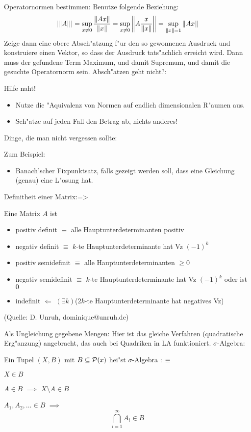 \trick Operatornormen bestimmen:{
  Benutze folgende Beziehung:
  \[\fnorm A = \sup_{x\ne 0} \frac{\norm{Ax}}{\norm{x}}
             = \sup_{x\ne 0} \norm{ A \frac x {\norm{x}} }
	     = \sup_{\norm{x} = 1} \norm{Ax}
    \]
  Zeige dann eine obere Absch"atzung f"ur den so gewonnenen Ausdruck und 
  konstruiere einen Vektor, so dass der Ausdruck tats"achlich erreicht wird.
  Dann muss der gefundene Term Maximum, und damit Supremum, und damit
  die gesuchte Operatornorm sein.
  }
\trick Absch"atzen geht nicht?:{
  Hilfe naht! 
  \begin{itemize}
    \item Nutze die "Aquivalenz von Normen auf endlich dimensionalen R"aumen 
      aus.
    \item Sch"atze auf jeden Fall den Betrag ab, nichts anderes!
    \end{itemize}
  }
\trick Dinge, die man nicht vergessen sollte:{
  Zum Beispiel:
  \begin{itemize}
    \item Banach'scher Fixpunktsatz, falls gezeigt werden soll, dass eine 
      Gleichung (genau) eine L"osung hat.
    \end{itemize}
  }
\theorem Definitheit einer Matrix:=>{
  Eine Matrix $A$ ist 
  \begin{itemize}
    \item positiv definit $\equiv$ alle Hauptunterdeterminanten positiv
    \item negativ definit $\equiv$ $k$-te Hauptunterdeterminante hat Vz $(-1)^k$
    \item positiv semidefinit $\equiv$ alle Hauptunterdeterminanten $\ge 0$
    \item negativ semidefinit $\equiv$ $k$-te Hauptunterdeterminante hat Vz $(-1)^k$
      oder ist $0$
    \item indefinit $\Leftarrow$ $(\exists k)$($2k$-te Hauptunterdeterminante 
      hat negatives Vz)
    \end{itemize}
  (Quelle: D. Unruh, dominique@unruh.de)
  }
\trick Als Ungleichung gegebene Mengen:{
  Hier ist das gleiche Verfahren (quadratische Erg"anzung) angebracht, das
  auch bei Quadriken in LA funktioniert.
  }
 $\sigma$-Algebra:{
  Ein Tupel $(X,B)$ mit $B\subseteq\cal P(x)$ hei"st $\sigma$-Algebra $:\equiv$
  \begin{stmts}
    \item $X\in B$
    \item $A\in B$ $\implies$ $X\setminus A\in B$
    \item $A_1,A_2,\ldots\in B$ $\implies$
      \[\bigcap_{i=1}^\infty A_i\in B
        \]
    \end{stmts}
  }
